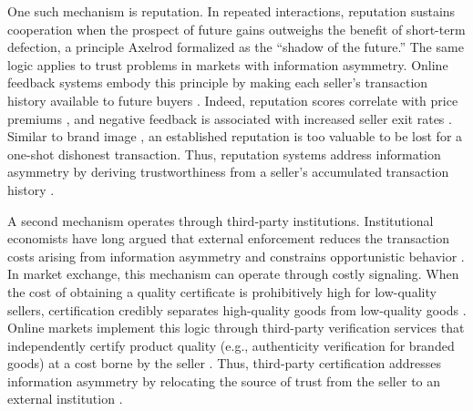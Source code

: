 \documentclass[11pt,letterpaper]{article}
\theoremstyle{definition}
\begin{document}
One such mechanism is reputation. In repeated interactions, reputation sustains cooperation when the prospect of future gains outweighs the benefit of short-term defection, a principle Axelrod \cite{Axelrod1984} formalized as the ``shadow of the future.'' The same logic applies to trust problems in markets with information asymmetry. Online feedback systems embody this principle by making each seller's transaction history available to future buyers \citep{Lehdonvirta2022}. Indeed, reputation scores correlate with price premiums \citep{Resnick2006}, and negative feedback is associated with increased seller exit rates \citep{CabralHortacsu2010}. Similar to brand image \citep{Wernerfelt1988}, an established reputation is too valuable to be lost for a one-shot dishonest transaction. Thus, reputation systems address information asymmetry by deriving trustworthiness from a seller's accumulated transaction history \citep{ResnickZeckhauser2002, Cook2009}.

A second mechanism operates through third-party institutions. Institutional economists have long argued that external enforcement reduces the transaction costs arising from information asymmetry and constrains opportunistic behavior \citep{North1990, Williamson1985}. In market exchange, this mechanism can operate through costly signaling. When the cost of obtaining a quality certificate is prohibitively high for low-quality sellers, certification credibly separates high-quality goods from low-quality goods \citep{Spence1973, MilgromRoberts1986}. Online markets implement this logic through third-party verification services that independently certify product quality (e.g., authenticity verification for branded goods) at a cost borne by the seller \citep{DranovJin2010}. Thus, third-party certification addresses information asymmetry by relocating the source of trust from the seller to an external institution \citep[see][for the same logic in the context of auditing]{Wilson1983}.
\end{document}
